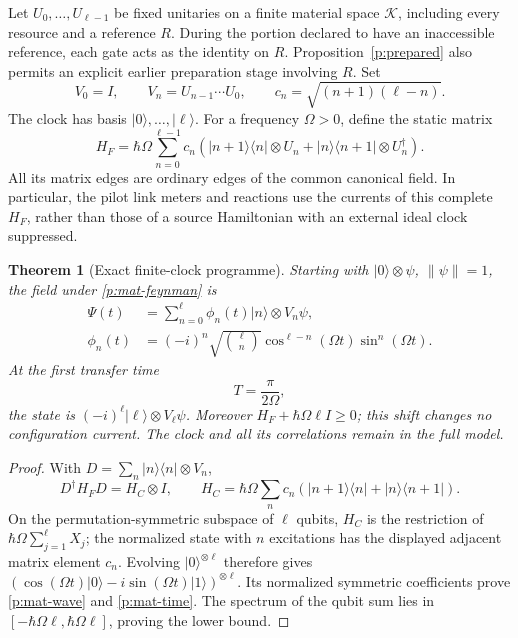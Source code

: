 \documentclass[11pt,oneside,openany]{book}
\newtheorem{theorem}{Theorem}[chapter]
\theoremstyle{definition}
\theoremstyle{remark}\newtheorem{remark}[theorem]{Remark}
\begin{document}
Let $U_0,\ldots,U_{\ell-1}$ be fixed unitaries on a finite material space
$\mathcal K$, including every resource and a reference $R$.  During the
portion declared to have an inaccessible reference, each gate acts as
the identity on $R$.  Proposition~\ref{p:prepared} also permits an
explicit earlier preparation stage involving $R$.  Set
\begin{equation}\label{p:mat-prefix}
 V_0=I,\qquad V_n=U_{n-1}\cdots U_0,\qquad
 c_n=\sqrt{(n+1)(\ell-n)}.
\end{equation}
The clock has basis $|0\rangle,\ldots,|\ell\rangle$.  For a frequency
$\Omega>0$, define the static matrix
\begin{equation}\label{p:mat-feynman}
 H_F=\hbar\Omega\sum_{n=0}^{\ell-1}c_n
 \left(|n+1\rangle\langle n|\otimes U_n+
 |n\rangle\langle n+1|\otimes U_n^\dagger\right).
\end{equation}
All its matrix edges are ordinary edges of the common canonical field.
In particular, the pilot link meters and reactions use the currents of
this complete $H_F$, rather than those of a source Hamiltonian with an
external ideal clock suppressed.

\begin{theorem}[Exact finite-clock programme]\label{p:mat-clock}
Starting with $|0\rangle\otimes\psi$, $\|\psi\|=1$, the field under
\eqref{p:mat-feynman} is
\begin{align}\label{p:mat-wave}
 \Psi(t)&=\sum_{n=0}^{\ell}\phi_n(t)|n\rangle\otimes V_n\psi,\\
 \phi_n(t)&=(-i)^n\sqrt{\binom\ell n}
   \cos^{\ell-n}(\Omega t)\sin^n(\Omega t).\nonumber
\end{align}
At the first transfer time
\begin{equation}\label{p:mat-time}
 T=\frac{\pi}{2\Omega},
\end{equation}
the state is $(-i)^\ell|\ell\rangle\otimes V_\ell\psi$.
Moreover $H_F+\hbar\Omega\ell I\ge0$; this shift changes no configuration
current.  The clock and all its correlations remain in the full model.
\end{theorem}
\begin{proof}
With $D=\sum_n|n\rangle\langle n|\otimes V_n$,
\[
 D^\dagger H_FD=H_C\otimes I,\qquad
 H_C=\hbar\Omega\sum_nc_n
       (|n+1\rangle\langle n|+|n\rangle\langle n+1|).
\]
On the permutation-symmetric subspace of $\ell$ qubits, $H_C$ is the
restriction of $\hbar\Omega\sum_{j=1}^\ell X_j$; the normalized state
with $n$ excitations has the displayed adjacent matrix element $c_n$.
Evolving $|0\rangle^{\otimes\ell}$ therefore gives
$(\cos(\Omega t)|0\rangle-i\sin(\Omega t)|1\rangle)^{\otimes\ell}$.
Its normalized symmetric coefficients prove \eqref{p:mat-wave} and
\eqref{p:mat-time}.  The spectrum of the qubit sum lies in
$[-\hbar\Omega\ell,\hbar\Omega\ell]$, proving the lower bound.
\end{proof}
\end{document}
